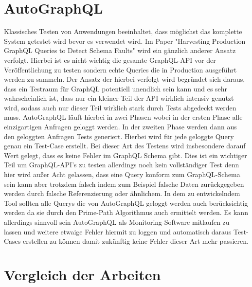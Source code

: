 \section{AutoGraphQL}

Klassisches Testen von Anwendungen beeinhaltet, dass möglichst das komplette System getestet wird bevor es verwendet wird.
Im Paper "Harvesting Production GraphQL Queries to Detect Schema Faults" wird ein gänzlich anderer Ansatz verfolgt.
Hierbei ist es nicht wichtig die gesamte GraphQL-API vor der Veröffentlichung zu testen sondern
echte Queries die in Production ausgeführt werden zu sammeln.
Der Ansatz der hierbei verfolgt wird begründet sich daraus,
dass ein Testraum für GraphQL potentiell unendlich sein kann und es sehr wahrscheinlich ist, dass nur ein kleiner
Teil der API wirklich intensiv genutzt wird, sodass auch nur dieser Teil wirklich stark durch Tests abgedeckt werden muss.
AutoGraphQL läuft hierbei in zwei Phasen wobei in der ersten Phase alle einzigartigen Anfragen geloggt werden.
In der zweiten Phase werden dann aus den geloggten Anfragen Tests generiert.
Hierbei wird für jede geloggte Query genau ein Test-Case erstellt.
Bei dieser Art des Testens wird insbesondere darauf Wert gelegt, dass es keine Fehler im GraphQL Schema gibt.
Dies ist ein wichtiger Teil um GraphQL-API's zu testen allerdings noch kein vollständiger Test denn hier wird außer Acht gelassen,
dass eine Query konform zum GraphQL-Schema sein kann aber trotzdem falsch indem zum Beispiel falsche Daten zurückgegeben werden
durch falsche Referenzierung oder ähnlichem.
In dem zu entwickelndem Tool sollten alle Querys die von AutoGraphQL geloggt werden auch berücksichtig werden da sie durch
den Prime-Path Algorithmus auch ermittelt werden.
Es kann allerdings sinnvoll sein AutoGraphQL als Monitoring-Software mitlaufen zu lassen und weitere etwaige Fehler hiermit zu loggen
und automatisch daraus Test-Cases erstellen zu können damit zukünftig keine Fehler dieser Art mehr passieren.

\section{Vergleich der Arbeiten}

